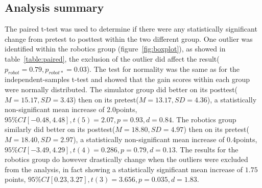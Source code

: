 \subsection{Analysis summary}
The paired t-test was used to determine if there were any statistically significant change from pretest to posttest within the two different group. One outlier was identified within the robotics group (figure~\ref{fig:boxplot}), as showed in table~\ref{table:paired}, the exclusion of the outlier did affect the result($p_{robot} = 0.79, p_{robot*} = 0.03$).
The test for normality was the same as for the independent-samples t-test and showed that the gain scores within each group were normally distributed. 
The simulator group did better on its posttest($M = 15.17, SD = 3.43$) then on its pretest($M = 13.17, SD = 4.36$), a statistically non-significant mean increase of $2.0$points, $95\%CI[-0.48,4.48],t(5)=2.07,p=0.93,d=0.84$.
The robotics group similarly did better on its posttest($M=18.80, SD = 4.97$) then on its pretest($M = 18.40, SD = 2.97$), a statistically non-significant mean increase of $0.4$points, $95\%CI[-3.49,4.29],t(4)=0.286,p=0.79,d=0.13$. The results for the robotics group do however drastically change when the outliers were excluded from the analysis, in fact showing a statistically significant mean increase of $1.75$points, $95\%CI[0.23,3.27],t(3)=3.656,p=0.035,d=1.83$.

